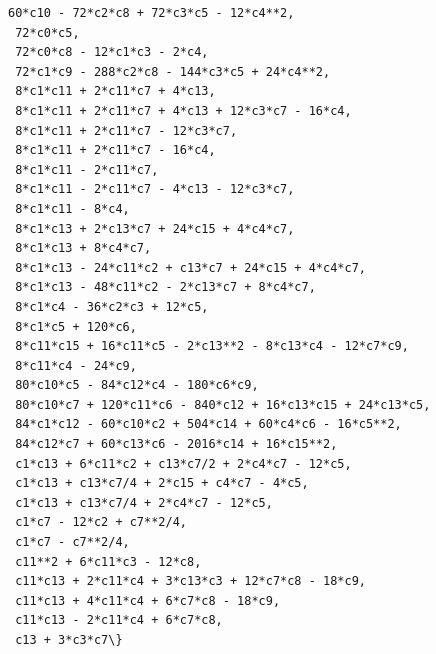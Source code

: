 \documentclass[11pt]{article}
\begin{document}
\begin{tcolorbox}[breakable, size=fbox, boxrule=.5pt, pad at break*=1mm, opacityfill=0]
\begin{Verbatim}[commandchars=\\\{\}]
 60*c10 - 72*c2*c8 + 72*c3*c5 - 12*c4**2,
 72*c0*c5,
 72*c0*c8 - 12*c1*c3 - 2*c4,
 72*c1*c9 - 288*c2*c8 - 144*c3*c5 + 24*c4**2,
 8*c1*c11 + 2*c11*c7 + 4*c13,
 8*c1*c11 + 2*c11*c7 + 4*c13 + 12*c3*c7 - 16*c4,
 8*c1*c11 + 2*c11*c7 - 12*c3*c7,
 8*c1*c11 + 2*c11*c7 - 16*c4,
 8*c1*c11 - 2*c11*c7,
 8*c1*c11 - 2*c11*c7 - 4*c13 - 12*c3*c7,
 8*c1*c11 - 8*c4,
 8*c1*c13 + 2*c13*c7 + 24*c15 + 4*c4*c7,
 8*c1*c13 + 8*c4*c7,
 8*c1*c13 - 24*c11*c2 + c13*c7 + 24*c15 + 4*c4*c7,
 8*c1*c13 - 48*c11*c2 - 2*c13*c7 + 8*c4*c7,
 8*c1*c4 - 36*c2*c3 + 12*c5,
 8*c1*c5 + 120*c6,
 8*c11*c15 + 16*c11*c5 - 2*c13**2 - 8*c13*c4 - 12*c7*c9,
 8*c11*c4 - 24*c9,
 80*c10*c5 - 84*c12*c4 - 180*c6*c9,
 80*c10*c7 + 120*c11*c6 - 840*c12 + 16*c13*c15 + 24*c13*c5,
 84*c1*c12 - 60*c10*c2 + 504*c14 + 60*c4*c6 - 16*c5**2,
 84*c12*c7 + 60*c13*c6 - 2016*c14 + 16*c15**2,
 c1*c13 + 6*c11*c2 + c13*c7/2 + 2*c4*c7 - 12*c5,
 c1*c13 + c13*c7/4 + 2*c15 + c4*c7 - 4*c5,
 c1*c13 + c13*c7/4 + 2*c4*c7 - 12*c5,
 c1*c7 - 12*c2 + c7**2/4,
 c1*c7 - c7**2/4,
 c11**2 + 6*c11*c3 - 12*c8,
 c11*c13 + 2*c11*c4 + 3*c13*c3 + 12*c7*c8 - 18*c9,
 c11*c13 + 4*c11*c4 + 6*c7*c8 - 18*c9,
 c11*c13 - 2*c11*c4 + 6*c7*c8,
 c13 + 3*c3*c7\}
\end{Verbatim}
\end{tcolorbox}
        
\end{document}

